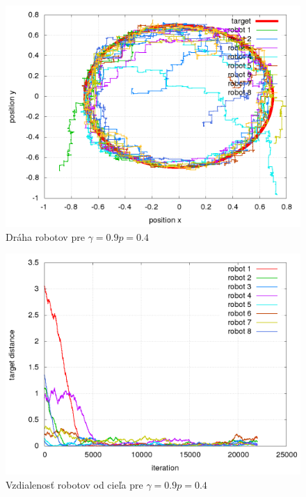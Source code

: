 \begin{figure}[!htb]
\centering
\includegraphics[scale=.4]{../../results_q_learning/nano_q_learning/result_04_03/robot_path.png}
\caption{Dráha robotov pre $\gamma = 0.9 p = 0.4$}
\label{img:nano_q_result_04_3_path}
\end{figure}

\begin{figure}[!htb]
\centering
\includegraphics[scale=.4]{../../results_q_learning/nano_q_learning/result_04_03/robot_reward.png}
\caption{Vzdialenosť robotov od cieľa pre $\gamma = 0.9 p = 0.4$}
\label{img:nano_q_result_04_3_error}
\end{figure}


